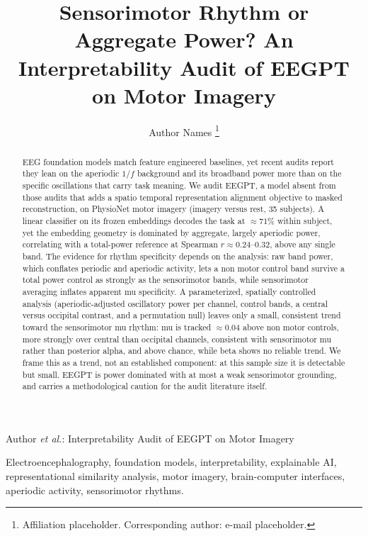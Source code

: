 \documentclass[journal]{IEEEtran}
\begin{document}
\title{Sensorimotor Rhythm or Aggregate Power? An Interpretability Audit of
EEGPT on Motor Imagery}

\author{Author Names%
\thanks{Affiliation placeholder. Corresponding author: e-mail placeholder.}}

%
{Author \MakeLowercase{\textit{et al.}}: Interpretability Audit of EEGPT on Motor Imagery}

\maketitle

\begin{abstract}
EEG foundation models match feature engineered baselines, yet recent audits
report they lean on the aperiodic $1/f$ background and its broadband power more
than on the specific oscillations that carry task meaning. We audit EEGPT, a
model absent from those audits that adds a spatio temporal representation
alignment objective to masked reconstruction, on PhysioNet motor imagery
(imagery versus rest, 35 subjects). A linear classifier on its frozen embeddings
decodes the task at ${\approx}71\%$ within subject, yet the embedding geometry is
dominated by aggregate, largely aperiodic power, correlating with a total-power
reference at Spearman $r \approx 0.24$--$0.32$, above any single band. The
evidence for rhythm specificity depends on the analysis: raw band power, which
conflates periodic and aperiodic activity, lets a non motor control band survive
a total power control as strongly as the sensorimotor bands, while sensorimotor
averaging inflates apparent mu specificity. A parameterized, spatially
controlled analysis (aperiodic-adjusted oscillatory power per channel, control
bands, a central versus occipital contrast, and a permutation null) leaves only
a small, consistent trend toward the sensorimotor mu rhythm: mu is tracked
${\approx}0.04$ above non motor controls, more strongly over central than
occipital channels, consistent with sensorimotor mu rather than posterior alpha,
and above chance, while beta shows no reliable trend. We frame this as a trend,
not an established component: at this sample size it is detectable but small.
EEGPT is power dominated with at most a weak sensorimotor grounding, and carries
a methodological caution for the audit literature itself.
\end{abstract}

\begin{IEEEkeywords}
Electroencephalography, foundation models, interpretability, explainable AI,
representational similarity analysis, motor imagery, brain-computer interfaces,
aperiodic activity, sensorimotor rhythms.
\end{IEEEkeywords}
\end{document}
